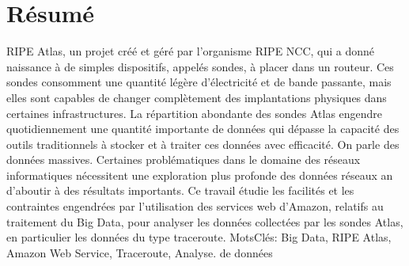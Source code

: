 \chapter*{Résumé}


RIPE Atlas, un projet créé et géré par l'organisme RIPE NCC, qui a donné naissance à de
simples dispositifs, appelés sondes, à placer dans un routeur. Ces sondes consomment une quantité
légère d'électricité et de bande passante, mais elles sont capables de changer complètement des
implantations physiques dans certaines infrastructures.
La répartition abondante des sondes Atlas engendre quotidiennement une quantité importante
de données qui dépasse la capacité des outils traditionnels à stocker et à traiter ces données avec
efficacité. On parle des données massives. Certaines problématiques dans le domaine des réseaux
informatiques nécessitent une exploration plus profonde des données réseaux an d'aboutir à des
résultats importants.
Ce travail étudie les facilités et les contraintes engendrées par l'utilisation des services web
d'Amazon, relatifs au traitement du Big Data, pour analyser les données collectées par les sondes
Atlas, en particulier les données du type traceroute.
MotsClés:
Big Data, RIPE Atlas, Amazon Web Service, Traceroute, Analyse. de données